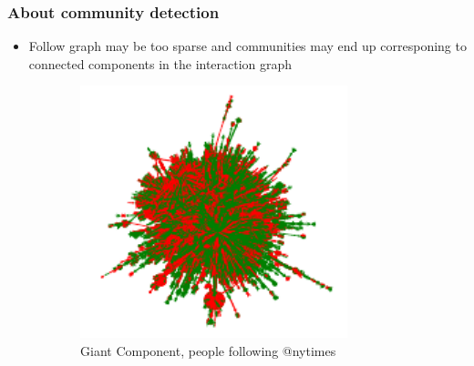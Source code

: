 \documentclass{beamer}
\begin{document}
\begin{frame}[c]
    \frametitle{About community detection}
    \begin{itemize}
        \item Follow graph may be too sparse and communities may end up
            corresponing to connected components in the interaction graph
    \end{itemize}

    \begin{figure}
        \begin{center}
            \begin{subfigure}[b]{0.4\textwidth}
                \centering
                \includegraphics[width=\textwidth]{img/nytimes-giant.png}
                \caption{Giant Component, people following @nytimes}
            \end{subfigure}
            \begin{subfigure}[b]{0.4\textwidth}
                \centering

\end{subfigure}
\end{center}
\end{figure}
\end{frame}
\end{document}
